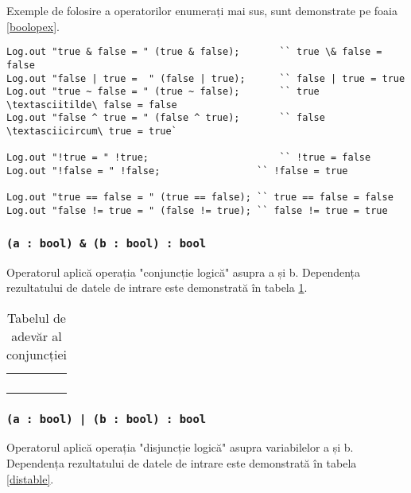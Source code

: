 Exemple de folosire a operatorilor enumerați mai sus, sunt demonstrate pe foaia \ref{boolopex}.

\begin{lstlisting}[caption=Exemple de folosite a operatorilor asupra tipului bool, label=boolopex]
Log.out "true & false = " (true & false);		`` true \& false = false
Log.out "false | true =  " (false | true);		`` false | true = true
Log.out "true ~ false = " (true ~ false);		`` true \textasciitilde\ false = false
Log.out "false ^ true = " (false ^ true);		`` false \textasciicircum\ true = true`

Log.out "!true = " !true;						`` !true = false
Log.out "!false = " !false;					`` !false = true

Log.out "true == false = " (true == false);	`` true == false = false
Log.out "false != true = " (false != true);	`` false != true = true
\end{lstlisting}

\subsubsection{\lstinline|(a : bool) & (b : bool) : bool|}

Operatorul aplică operația "conjuncție logică" asupra a și b. Dependența rezultatului de datele de intrare este demonstrată în tabela \ref{conjtable}.

\begin{table}[htb]
	\caption{Tabelul de adevăr al conjuncției}
	\label{conjtable}
	\begin{tabular}{|c|c|c|}
		\hline
		\code{a} & \code{b} & \code{a \& b} \\ \hline
		\false{} & \false{} & \false{}  	\\ \hline
		\false{} & \true{}  & \false{}  	\\ \hline
		\true{}  & \false{} & \false{}  	\\ \hline
		\true{}  & \true{}  & \true{}   	\\ \hline
	\end{tabular}
	\vspace{-2em}
\end{table}

\subsubsection{\lstinline`(a : bool) | (b : bool) : bool`}

Operatorul aplică operația "disjuncție logică" asupra variabilelor a și b. Dependența rezultatului de datele de intrare este demonstrată în tabela  \ref{distable}.

